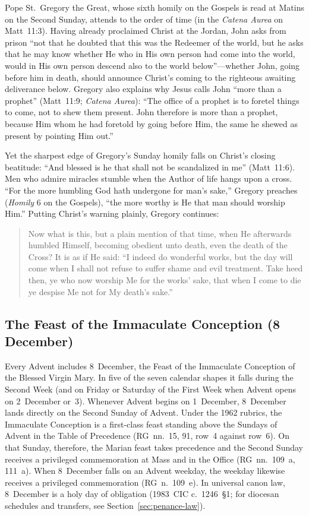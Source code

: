 Pope St.~Gregory the Great, whose sixth homily on the Gospels is read
at Matins on the Second Sunday, attends to the order of time (in the
\textit{Catena Aurea} on Matt~11:3). Having already proclaimed Christ at
the Jordan, John asks from prison ``not that he doubted that this was
the Redeemer of the world, but he asks that he may know whether He who
in His own person had come into the world, would in His own person
descend also to the world below''---whether John, going before him in
death, should announce Christ's coming to the righteous awaiting
deliverance below. Gregory also explains why Jesus calls John ``more
than a prophet'' (Matt~11:9; \textit{Catena Aurea}): ``The office of a
prophet is to foretel things to come, not to shew them present. John
therefore is more than a prophet, because Him whom he had foretold by
going before Him, the same he shewed as present by pointing Him out.''

Yet the sharpest edge of Gregory's Sunday homily falls on Christ's
closing beatitude: ``And blessed is he that shall not be scandalized in
me'' (Matt~11:6). Men who admire miracles stumble when the Author of
life hangs upon a cross. ``For the more humbling God hath undergone for
man's sake,'' Gregory preaches (\textit{Homily} 6 on the Gospels), ``the
more worthy is He that man should worship Him.'' Putting Christ's
warning plainly, Gregory continues:

\begin{quote}
Now what is this, but a plain mention of that time, when He afterwards
humbled Himself, becoming obedient unto death, even the death of the
Cross? It is as if He said: ``I indeed do wonderful works, but the day
will come when I shall not refuse to suffer shame and evil treatment.
Take heed then, ye who now worship Me for the works' sake, that when I
come to die ye despise Me not for My death's sake.''
\end{quote}

\subsection{The Feast of the Immaculate Conception (8 December)}

Every Advent includes 8~December, the Feast of the Immaculate Conception
of the Blessed Virgin Mary. In five of the seven calendar shapes it
falls during the Second Week (and on Friday or Saturday of the First
Week when Advent opens on 2~December or~3). Whenever Advent begins on
1~December, 8~December lands directly on the Second Sunday of Advent.
Under the 1962 rubrics, the Immaculate Conception is a first-class feast
standing above the Sundays of Advent in the Table of Precedence
(RG~nn.~15, 91, row~4 against row~6). On that Sunday, therefore, the
Marian feast takes precedence and the Second Sunday receives a
privileged commemoration at Mass and in the Office (RG~nn.~109~a,
111~a). When 8~December falls on an Advent weekday, the weekday likewise
receives a privileged commemoration (RG~n.~109~e). In universal canon
law, 8~December is a holy day of obligation (1983~CIC c.~1246~\S{}1; for
diocesan schedules and transfers, see Section~\ref{sec:penance-law}).

